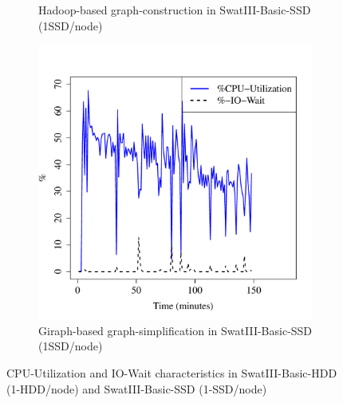 \documentclass[conference]{IEEEtran}
\begin{document}
\begin{figure}[htb]
\begin{subfigure}[b]{0.23\textwidth}
                \caption{Hadoop-based graph-construction in SwatIII-Basic-SSD (1SSD/node)}
                \label{fig:BGCPUSSD}
        \end{subfigure}    
        \begin{subfigure}[b]{0.23\textwidth}
                \includegraphics[width=\textwidth]{Figure/SystemData/Plots/ECCPUSSD.pdf}
                \caption{Giraph-based graph-simplification in SwatIII-Basic-SSD (1SSD/node)}
                \label{fig:ECCPUSSD}
        \end{subfigure}
        \caption{CPU-Utilization and IO-Wait characteristics in SwatIII-Basic-HDD (1-HDD/node) and SwatIII-Basic-SSD (1-SSD/node)}\label{fig:HddSsdCPU}
\end{figure}
\end{document}
